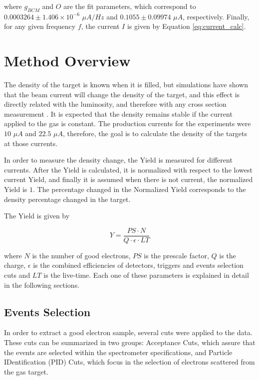 \documentclass[final,5p,times,twocolumn]{elsarticle}
\begin{document}
\noindent where $g_{BCM}$ and $O$ are the fit parameters, which correspond to $0.0003264 \pm 1.406 \times 10^{-6}$ $\mu A/Hz$ and $0.1055 \pm 0.09974$  $\mu A$, respectively. Finally, for any given 
frequency $f$, the current $I$ is given by Equation \ref{eq:current_calc}.

\section{Method Overview}

The density of the target is known when it is filled, but simulations have shown that the beam current will change the density of the target, and this effect is directly related with the luminosity, and therefore with any cross section measurement \cite{celldes}. It is expected that the density remains stable if the current applied to the gas is constant. The production currents for the experiments were $10$ $\mu A$ and $22.5$ $\mu A$, therefore, the goal is to calculate the density of the targets at those currents.  

In order to measure the density change, the Yield is measured for different currents. After the Yield is calculated, it is normalized with respect to the lowest current Yield, and finally it is assumed when there is not current, the normalized Yield is $1$. The percentage changed in the Normalized Yield corresponds to the density percentage changed in the target. 

The Yield is given by 

\begin{equation}
Y = \frac{PS \cdot N}{ Q \cdot \epsilon \cdot LT }
\label{eq:yield}
\end{equation}

\noindent where $N$ is the number of good electrons, $PS$ is the prescale factor, $Q$ is the charge, $\epsilon $ is the combined efficiencies of detectors, triggers and events selection cuts and $LT$ is the live-time. Each one of these parameters is explained in detail in the following sections.

\subsection{Events Selection}
In order to extract a good electron sample, several cuts were applied to the data. These cuts can be summarized in two groups: Acceptance Cuts, which assure that the events are selected within the spectrometer specifications, and Particle IDentification (PID) Cuts, which focus in the selection of electrons scattered from the gas target. 
\end{document}
